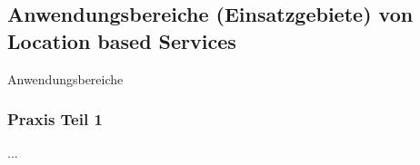 \subsection{Anwendungsbereiche (Einsatzgebiete) von Location based Services}
Anwendungsbereiche
	\subsubsection{Praxis Teil 1}
...
